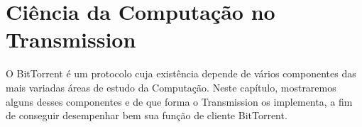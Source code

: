 
\chapter{Ciência da Computação no Transmission}
\label{cap:bcctransmission}

O BitTorrent é um protocolo cuja existência depende de vários componentes das mais
variadas áreas de estudo da Computação. Neste capítulo, mostraremos alguns desses
componentes e de que forma o Transmission os implementa, a fim de conseguir desempenhar
bem sua função de cliente BitTorrent.
















\afterpage{\clearpage}